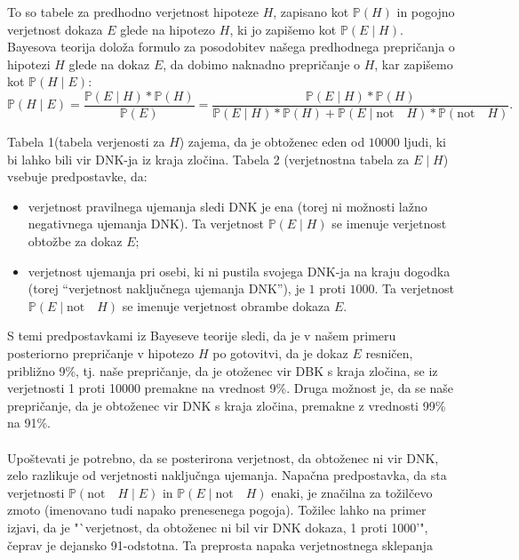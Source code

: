 \documentclass[a4paper,12pt]{article}
\begin{document}
To so tabele za predhodno verjetnost hipoteze $H$, zapisano kot $\mathbb{P}(H)$ in pogojno verjetnost dokaza $E$ glede na hipotezo $H$, ki 
jo zapišemo kot $\mathbb{P}(E \mid H)$. Bayesova teorija doloža formulo za posodobitev našega predhodnega prepričanja o hipotezi $H$ glede na 
dokaz $E$, da dobimo naknadno prepričanje o $H$, kar zapišemo kot $\mathbb{P}(H \mid E)$:
\[\mathbb{P}(H \mid E) = \frac{\mathbb{P}(E \mid H)*\mathbb{P}(H)}{\mathbb{P}(E)} = \frac{\mathbb{P}(E \mid H)*\mathbb{P}(H)}{\mathbb{P}(E \mid H)*\mathbb{P}(H) + \mathbb{P}(E \mid \text{not}\quad H)*\mathbb{P}(\text{not}\quad H)}.\]

Tabela 1(tabela verjenosti za $H$) zajema, da je obtoženec eden od $10000$ ljudi, ki bi lahko bili vir DNK-ja iz kraja zločina. Tabela 2 
(verjetnostna tabela za $E \mid H$) vsebuje predpostavke, da: 
\begin{itemize}
    \item verjetnost pravilnega ujemanja sledi DNK je ena (torej ni možnosti lažno negativnega ujemanja DNK). Ta verjetnost $\mathbb{P}(E \mid H)$ 
          se imenuje verjetnost obtožbe za dokaz $E$;
    \item verjetnost ujemanja pri osebi, ki ni pustila svojega DNK-ja na kraju dogodka (torej "`verjetnost naključnega ujemanja DNK"'), je $1$ 
          proti $1000$. Ta verjetnost $\mathbb{P}(E \mid \text{not}\quad H)$ se imenuje verjetnost obrambe dokaza $E$.
\end{itemize}

S temi predpostavkami iz Bayeseve teorije sledi, da je v našem primeru posteriorno prepričanje v hipotezo $H$ po gotovitvi, da je dokaz $E$ 
resničen, približno 9\%, tj. naše prepričanje, da je otoženec vir DBK s kraja zločina, se iz verjetnosti 1 proti 10000 premakne na vrednost 9\%. 
Druga možnost je, da se naše prepričanje, da je obtoženec vir DNK s kraja zločina, premakne z vrednosti 99\% na 91\%. \\ \\

Upoštevati je potrebno, da se posterirona verjetnost, da obtoženec ni vir DNK, zelo razlikuje od verjetnosti naključnga ujemanja. Napačna 
predpostavka, da sta verjetnosti $\mathbb{P}(\text{not}\quad H \mid E)$ in $\mathbb{P}(E \mid \text{not}\quad H)$ enaki, je značilna za 
tožilčevo zmoto (imenovano tudi napako prenesenega pogoja). Tožilec lahko na primer izjavi, da je "`verjetnost, da obtoženec ni bil vir DNK dokaza, 1 proti 1000'", čeprav je dejansko 91-odstotna. Ta preprosta napaka verjetnostnega sklepanja
\end{document}
